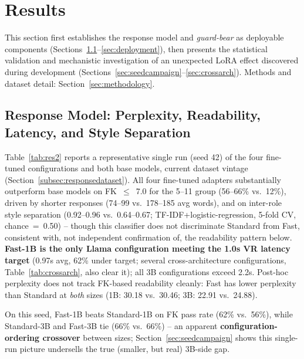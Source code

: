 \documentclass[pdflatex,sn-mathphys-num]{sn-jnl}%
\begin{document}
\section{Results}\label{sec2}

This section first establishes the response model and \textit{guard-bear} as deployable components (Sections~\ref{sec:responsemodel}--\ref{sec:deployment}), then presents the statistical validation and mechanistic investigation of an unexpected LoRA effect discovered during development (Sections~\ref{sec:seedcampaign}--\ref{sec:crossarch}). Methods and dataset detail: Section~\ref{sec:methodology}.

\subsection{Response Model: Perplexity, Readability, Latency, and Style Separation}\label{sec:responsemodel}

Table~\ref{tab:res2} reports a representative single run (seed 42) of the four fine-tuned configurations and both base models, current dataset vintage (Section~\ref{subsec:responsedataset}). All four fine-tuned adapters substantially outperform base models on FK~$\leq$~7.0 for the 5--11 group (56--66\% vs.\ 12\%), driven by shorter responses (74--99 vs.\ 178--185 avg words), and on inter-role style separation (0.92--0.96 vs.\ 0.64--0.67; TF-IDF+logistic-regression, 5-fold CV, chance~=~0.50) -- though this classifier does not discriminate Standard from Fast, consistent with, not independent confirmation of, the readability pattern below. \textbf{Fast-1B is the only Llama configuration meeting the 1.0s VR latency target} (0.97s avg, 62\% under target; several cross-architecture configurations, Table~\ref{tab:crossarch}, also clear it); all 3B configurations exceed 2.2s. Post-hoc perplexity does not track FK-based readability cleanly: Fast has lower perplexity than Standard at \emph{both} sizes (1B: 30.18 vs.\ 30.46; 3B: 22.91 vs.\ 24.88).

On this seed, Fast-1B beats Standard-1B on FK pass rate (62\% vs.\ 56\%), while Standard-3B and Fast-3B tie (66\% vs.\ 66\%) -- an apparent \textbf{configuration-ordering crossover} between sizes; Section~\ref{sec:seedcampaign} shows this single-run picture undersells the true (smaller, but real) 3B-side gap.
\end{document}
